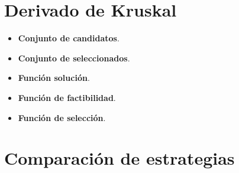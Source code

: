 \documentclass[12pt,spanish]{article}
\begin{document}
\section{Derivado de Kruskal}

\begin{itemize}
	\item \textbf{Conjunto de candidatos}. 
	\item \textbf{Conjunto de seleccionados}. 
	\item \textbf{Función solución}. 
	\item \textbf{Función de factibilidad}. 
	\item \textbf{Función de selección}. 
\end{itemize}


\section{Comparación de estrategias}

\end{document}
